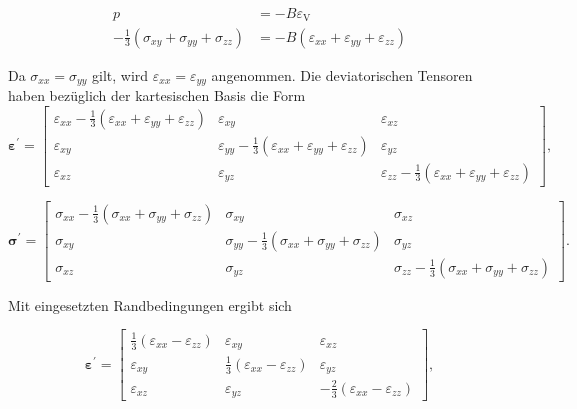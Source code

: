 \documentclass[a4paper, 10pt, 
               numbers=noenddot, toc=graduated,
               headsepline=true, footsepline=true,
               twoside=false, titlepage=true, 
               bibliography=totoc]{scrartcl}
\begin{document}
	\begin{align}\label{eqn:visco2}
		p &= - B \varepsilon_\mathrm{V}\\
		-\frac{1}{3} \left(\sigma_{xy} + \sigma_{yy} + \sigma_{zz} \right) &= - B \left( \varepsilon_{xx} + \varepsilon_{yy} + \varepsilon_{zz} \right)
	\end{align}
	
	Da $\sigma_{xx} = \sigma_{yy}$ gilt, wird $\varepsilon_{xx} = \varepsilon_{yy}$ angenommen. Die deviatorischen Tensoren haben bezüglich der kartesischen Basis die Form
	\begin{equation}
	  \bm{\varepsilon}^{'}  = \begin{bmatrix}
    \varepsilon_{xx} - \frac{1}{3} \left( \varepsilon_{xx} + \varepsilon_{yy} + \varepsilon_{zz} \right)     & \varepsilon_{xy} & \varepsilon_{xz} \\
     \varepsilon_{xy} &  \varepsilon_{yy} - \frac{1}{3} \left( \varepsilon_{xx} + \varepsilon_{yy} + \varepsilon_{zz} \right)     &  \varepsilon_{yz}  \\
     \varepsilon_{xz} &  \varepsilon_{yz} &  \varepsilon_{zz} - \frac{1}{3} \left( \varepsilon_{xx} + \varepsilon_{yy} + \varepsilon_{zz} \right)    
\end{bmatrix}, 
	\end{equation}
	
		\begin{equation}
	  \bm{\sigma}^{'}  = \begin{bmatrix}
    \sigma_{xx} - \frac{1}{3} \left( \sigma_{xx} + \sigma_{yy} + \sigma_{zz} \right)     & \sigma_{xy} & \sigma_{xz} \\
     \sigma_{xy} &  \sigma_{yy} - \frac{1}{3} \left( \sigma_{xx} + \sigma_{yy} + \sigma_{zz} \right)     &  \sigma_{yz}  \\
     \sigma_{xz} &  \sigma_{yz} &  \sigma_{zz} - \frac{1}{3} \left( \sigma_{xx} + \sigma_{yy} + \sigma_{zz} \right)    
\end{bmatrix}.
	\end{equation}
	
	Mit eingesetzten Randbedingungen ergibt sich
	
	\begin{equation}
	  \bm{\varepsilon}^{'}  = \begin{bmatrix}
    \frac{1}{3} \left( \varepsilon_{xx} - \varepsilon_{zz} \right)     & \varepsilon_{xy} & \varepsilon_{xz} \\
     \varepsilon_{xy} &  \frac{1}{3} \left( \varepsilon_{xx} - \varepsilon_{zz} \right)     &  \varepsilon_{yz}  \\
     \varepsilon_{xz} &  \varepsilon_{yz} &  - \frac{2}{3} \left( \varepsilon_{xx} - \varepsilon_{zz} \right)
\end{bmatrix}, 
	\end{equation}
	
\end{document}

